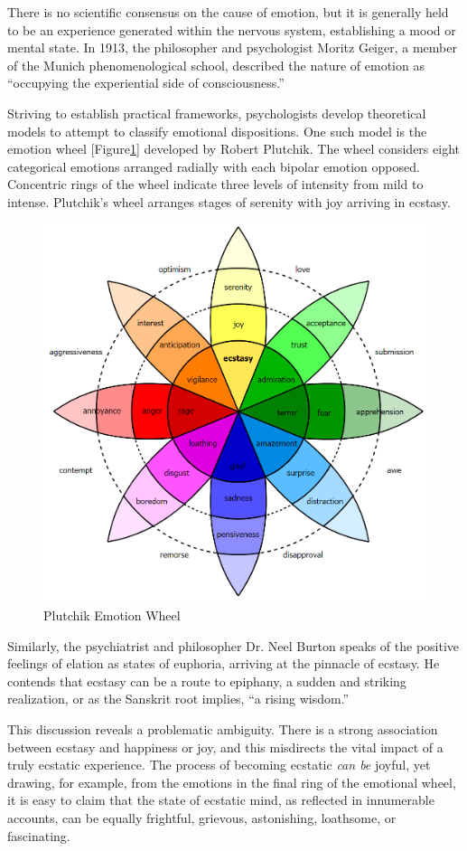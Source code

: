 \documentclass{UIdahoMastersThesis}
\begin{document}
There is no scientific consensus on the cause of emotion, but it is generally held to be an experience generated within the nervous system, establishing a mood or mental state. In 1913, the philosopher and psychologist Moritz Geiger, a member of the Munich phenomenological school, described the nature of emotion as ``occupying the experiential side of consciousness.''\cite{mayer-gross_translation:_nodate}   

Striving to establish practical frameworks, psychologists develop theoretical models to attempt to classify emotional dispositions. One such model is the emotion wheel [Figure\ref{fig:wheel}] developed by Robert Plutchik. The wheel considers eight categorical emotions arranged radially with each bipolar emotion opposed. Concentric rings of the wheel indicate three levels of intensity from mild to intense. Plutchik's wheel arranges stages of serenity with joy arriving in ecstasy.

\begin{figure}[h!]
	\centering
	\includegraphics[width=0.72\linewidth]{plutchik_wheel.png}
	\caption{Plutchik Emotion Wheel}
	\label{fig:wheel}
\end{figure}

Similarly, the psychiatrist and philosopher Dr. Neel Burton speaks of the positive feelings of elation as states of euphoria, arriving at the pinnacle of ecstasy. He contends that ecstasy can be a route to epiphany, a sudden and striking realization, or as the Sanskrit root implies, ``a rising wisdom.''\cite{burton_heaven_2015}

This discussion reveals a problematic ambiguity. There is a strong association between ecstasy and happiness or joy, and this misdirects the vital impact of a truly ecstatic experience. The process of becoming ecstatic \emph{can be} joyful, yet drawing, for example, from the emotions in the final ring of the emotional wheel, it is easy to claim that the state of ecstatic mind, as reflected in innumerable accounts, can be equally frightful, grievous, astonishing, loathsome, or fascinating.
\end{document}
